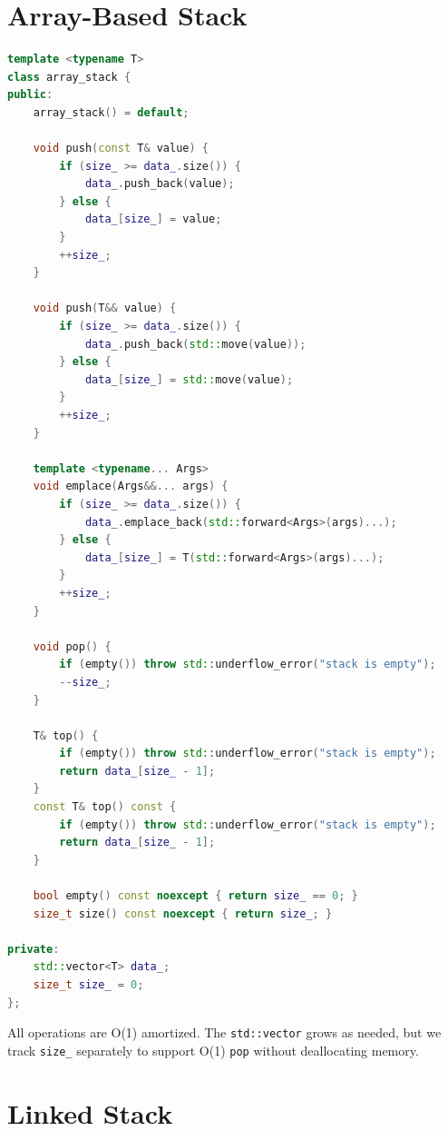 \section{Array-Based Stack}

\begin{lstlisting}[language=C++]
template <typename T>
class array_stack {
public:
    array_stack() = default;

    void push(const T& value) {
        if (size_ >= data_.size()) {
            data_.push_back(value);
        } else {
            data_[size_] = value;
        }
        ++size_;
    }

    void push(T&& value) {
        if (size_ >= data_.size()) {
            data_.push_back(std::move(value));
        } else {
            data_[size_] = std::move(value);
        }
        ++size_;
    }

    template <typename... Args>
    void emplace(Args&&... args) {
        if (size_ >= data_.size()) {
            data_.emplace_back(std::forward<Args>(args)...);
        } else {
            data_[size_] = T(std::forward<Args>(args)...);
        }
        ++size_;
    }

    void pop() {
        if (empty()) throw std::underflow_error("stack is empty");
        --size_;
    }

    T& top() {
        if (empty()) throw std::underflow_error("stack is empty");
        return data_[size_ - 1];
    }
    const T& top() const {
        if (empty()) throw std::underflow_error("stack is empty");
        return data_[size_ - 1];
    }

    bool empty() const noexcept { return size_ == 0; }
    size_t size() const noexcept { return size_; }

private:
    std::vector<T> data_;
    size_t size_ = 0;
};
\end{lstlisting}

All operations are O(1) amortized. The \texttt{std::vector} grows as needed, but we track \texttt{size\_} separately to support O(1) \texttt{pop} without deallocating memory.

\section{Linked Stack}

